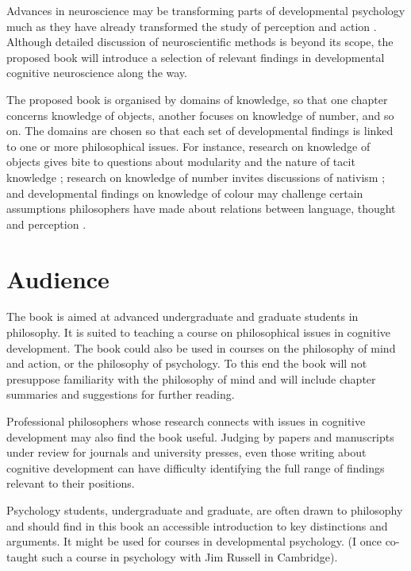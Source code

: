 \documentclass[12pt,\papersize]{extarticle}
\begin{document}
Advances in neuroscience may be transforming parts of developmental psychology much as they have already transformed the study of perception and action \citep{Johnson:2005az}. 
Although detailed discussion of neuroscientific methods is beyond its scope, the proposed book will introduce a selection of relevant findings in developmental cognitive neuroscience along the way. 

The proposed book is organised by domains of knowledge, so that one chapter concerns knowledge of objects, another focuses on  knowledge of number, and so on.  
The domains are chosen so that each set of developmental findings is linked to one or more philosophical issues. 
For instance, research on knowledge of objects gives bite to questions about modularity and the nature of tacit knowledge \citep{Fodor:1983dg,Davies:1989gg}; research on knowledge of number invites discussions of nativism \citep{Fodor:1981ep,Spelke:1998im}; and developmental findings on knowledge of colour may challenge certain assumptions philosophers have made about relations between language, thought and perception \citep{Gilbert:2006yb,Regier:2009ve}.  





\section{Audience}

The book is aimed at advanced undergraduate and graduate students in philosophy. 
It is suited to teaching a course on philosophical issues in cognitive development. 
The book could also be used in courses on the philosophy of mind and action, or the philosophy of psychology. 
To this end the book will not presuppose familiarity with the philosophy of mind and will include chapter summaries and suggestions for further reading.

Professional philosophers whose research connects with issues in cognitive development may also find the book useful.  
Judging by papers and manuscripts under review for journals and university presses, even those writing about cognitive development can have difficulty identifying the full range of findings relevant to their positions.

Psychology students, undergraduate and graduate, are often drawn to philosophy and should find in this book an accessible introduction to key distinctions and arguments. 
It might  be used for courses in developmental psychology. (I once co-taught such a course in psychology with Jim Russell in Cambridge).
\end{document}

